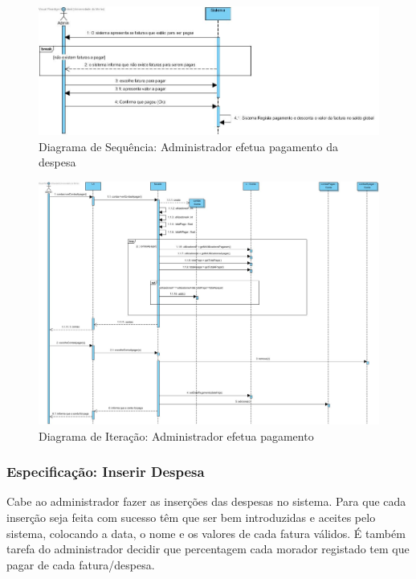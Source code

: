 \begin{figure}[htb!]
	\centering
	\includegraphics[scale=0.5]{imagens/diagramaSeq/EfetuaPagamentoDespesa}  
	\caption{Diagrama de Sequência: Administrador efetua pagamento da despesa }  
\end{figure}


\begin{figure}[htb!]
	\centering
	\includegraphics[scale=0.345]{imagens/diagramaIt/AdminPagaFactura}  
	\caption{Diagrama de Iteração: Administrador efetua pagamento }  
\end{figure}


\newpage
\subsubsection{Especificação: Inserir Despesa}

Cabe ao administrador fazer as inserções das despesas no sistema. Para que cada inserção seja feita com sucesso têm que ser bem introduzidas e aceites pelo sistema, colocando a data, o nome e os valores de cada fatura válidos.
É também tarefa do administrador decidir que percentagem cada morador registado tem que pagar de cada fatura/despesa.

